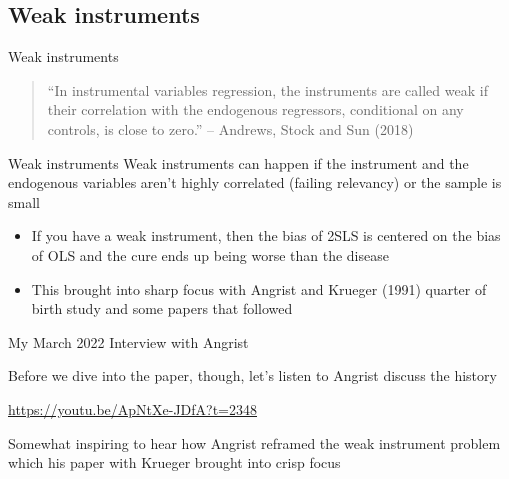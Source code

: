 \documentclass{beamer}
\begin{document}
\subsection{Weak instruments}

\begin{frame}{Weak instruments}

  \begin{quote}
    ``In instrumental variables regression, the instruments are called weak if their correlation with the endogenous regressors, conditional on any controls, is close to zero.'' -- Andrews, Stock and Sun (2018)
  \end{quote}

\end{frame}

\begin{frame}{Weak instruments}
  Weak instruments can happen if the instrument and the endogenous variables aren't highly correlated (failing relevancy) or the sample is small

  \begin{itemize}
    \item If you have a weak instrument, then the bias of 2SLS is centered on the bias of OLS and the cure ends up being worse than the disease
    \item This brought into sharp focus with Angrist and Krueger (1991) quarter of birth study and some papers that followed
  \end{itemize}

\end{frame}

\begin{frame}{My March 2022 Interview with Angrist}

  Before we dive into the paper, though, let's listen to Angrist discuss the history

  \bigskip

  \url{https://youtu.be/ApNtXe-JDfA?t=2348}

  \bigskip

  Somewhat inspiring to hear how Angrist reframed the weak instrument problem which his paper with Krueger brought into crisp focus

\end{frame}
\end{document}
